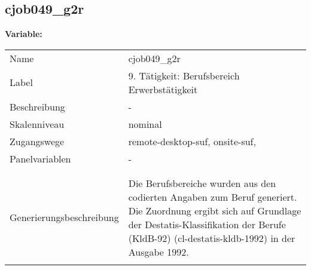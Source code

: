 	
	
	\subsection{cjob049\_g2r}
	\label{subSection:cjob049_g2r}

	\noindent\textbf{Variable:}\\
		\begin{tabular}{lL{11.3cm}}
			\label{tableVariable:cjob049_g2r}
			Name & cjob049\_g2r \\
			Label & 9. Tätigkeit: Berufsbereich Erwerbstätigkeit \\
			Beschreibung & - \\
			Skalenniveau & nominal \\
			Zugangswege &
				remote-desktop-suf,
				onsite-suf,
 \\
			Panelvariablen & -
			 \\
			 \\
 \\
					Generierungsbeschreibung & Die Berufsbereiche wurden aus den codierten Angaben zum Beruf generiert. Die Zuordnung ergibt sich auf Grundlage der Destatis-Klassifikation der Berufe (KldB-92) (cl-destatis-kldb-1992) in der Ausgabe 1992. 
				 \\	
			 \\
		\end{tabular}






